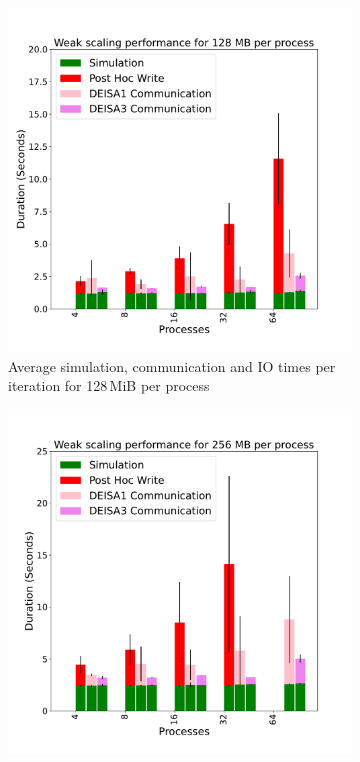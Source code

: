 \begin{figure}[h!]
     \centering
     \begin{subfigure}[b]{0.3\textwidth}
         \centering
         \includegraphics[width=\textwidth, height=\textwidth]{figures/128MB_1vs3vspost1vspost2.pdf}
         \caption{Average simulation, communication and IO times per iteration for 128\,MiB per process}
         \label{fig:X1128_1_3_p}
     \end{subfigure}
     \hfill
     \begin{subfigure}[b]{0.3\textwidth}
         \centering
         \includegraphics[width=\textwidth, height=\textwidth]{figures/256MB_1vs3vspost1vspost2.pdf}

\end{subfigure}
\end{figure}

